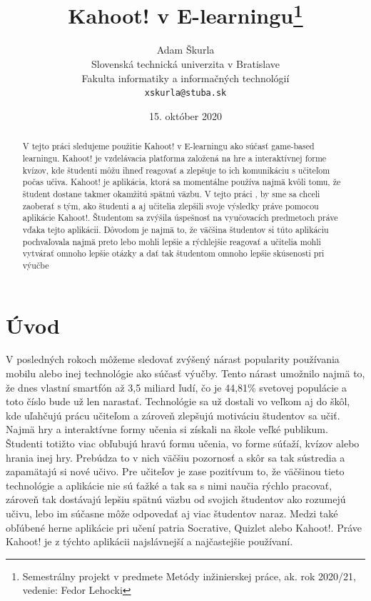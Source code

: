 \documentclass[10pt,oneside,slovak,a4paper]{article}
\title{Kahoot! v E-learningu\thanks{Semestrálny projekt v predmete Metódy inžinierskej práce, ak. rok 2020/21, vedenie: Fedor Lehocki}} %
\author{Adam Škurla\\[2pt]
	{\small Slovenská technická univerzita v Bratislave}\\
	{\small Fakulta informatiky a informačných technológií}\\
	{\small \texttt{xskurla@stuba.sk}}
	}
\date{\small 15. október 2020}
\begin{document}
\maketitle

\begin{abstract}
V tejto práci sledujeme použitie Kahoot! v E-learningu ako súčasť game-based learningu. Kahoot! je vzdelávacia platforma založená na hre a interaktívnej forme kvízov, kde študenti môžu ihneď reagovať a zlepšuje to ich komunikáciu s učiteľom počas učiva. Kahoot! je aplikácia, ktorá sa momentálne používa najmä kvôli tomu, že študent dostane takmer okamžitú spätnú väzbu. V tejto práci , by sme sa chceli zaoberať s tým, ako študenti a aj učitelia zlepšili svoje výsledky práve pomocou aplikácie Kahoot!. Študentom sa zvýšila úspešnosť na vyučovacích predmetoch práve vďaka tejto aplikácii. Dôvodom je najmä to, že väčšina študentov si túto aplikáciu pochvaľovala najmä preto lebo mohli lepšie a rýchlejšie reagovať a učitelia mohli vytvárať omnoho lepšie otázky a dať tak študentom omnoho lepšie skúsenosti pri výučbe
\end{abstract}



\section{Úvod}

V posledných rokoch môžeme sledovať zvýšený nárast popularity používania mobilu alebo inej technológie ako súčasť výučby. Tento nárast umožnilo najmä to, že dnes  vlastní smartfón až 3,5 miliard ľudí, čo je 44,81\% svetovej populácie\cite{Turner2020} a toto číslo bude už len narastať. Technológie sa už dostali vo veľkom aj do škôl, kde uľahčujú prácu učiteľom a zároveň zlepšujú motiváciu študentov sa učiť. Najmä hry a interaktívne formy učenia si získali na škole veľké publikum. Študenti totižto viac obľubujú hravú formu učenia, vo forme súťaží, kvízov alebo hrania inej hry\cite{WANG2020}. Prebúdza to v nich väčšiu pozornosť a skôr sa tak sústredia a zapamätajú si nové učivo. Pre učiteľov je zase pozitívum to, že väčšinou tieto technológie a aplikácie nie sú ťažké a tak sa s nimi naučia rýchlo pracovať, zároveň tak dostávajú lepšiu spätnú väzbu od svojich študentov ako rozumejú učivu, lebo im súčasne môže odpovedať aj viac študentov naraz. Medzi také obľúbené herne aplikácie pri učení patria Socrative, Quizlet alebo Kahoot!.\cite{Licorish} Práve Kahoot! je z týchto aplikácii najslávnejší a najčastejšie používaní.  
\end{document}
